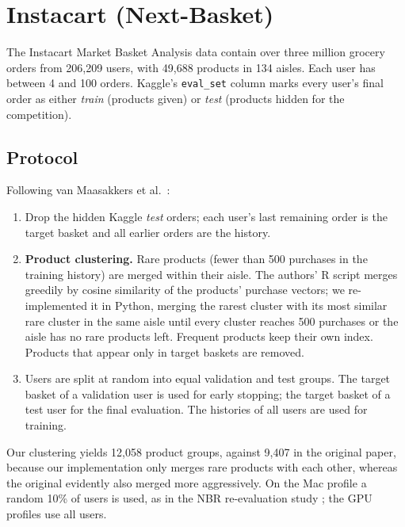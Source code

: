 \documentclass[12pt,a4paper]{report}
\begin{document}
\section{Instacart (Next-Basket)}

The Instacart Market Basket Analysis data contain over three million grocery
orders from 206,209 users, with 49,688 products in 134 aisles. Each user has
between 4 and 100 orders. Kaggle's \texttt{eval\_set} column marks every user's
final order as either \emph{train} (products given) or \emph{test} (products
hidden for the competition).

\subsection{Protocol}

Following van Maasakkers et al.\ \cite{vanmaasakkers2023}:

\begin{enumerate}
    \item Drop the hidden Kaggle \emph{test} orders; each user's last remaining
          order is the target basket and all earlier orders are the history.
    \item \textbf{Product clustering.} Rare products (fewer than 500 purchases in
          the training history) are merged within their aisle. The authors'
          R script merges greedily by cosine similarity of the products' purchase
          vectors; we re-implemented it in Python, merging the rarest cluster with
          its most similar rare cluster in the same aisle until every cluster
          reaches 500 purchases or the aisle has no rare products left. Frequent
          products keep their own index. Products that appear only in target
          baskets are removed.
    \item Users are split at random into equal validation and test groups. The
          target basket of a validation user is used for early stopping; the
          target basket of a test user for the final evaluation. The histories of
          all users are used for training.
\end{enumerate}

Our clustering yields 12,058 product groups, against 9,407 in the original
paper, because our implementation only merges rare products with each other,
whereas the original evidently also merged more aggressively. On the Mac profile a random 10\% of users is used, as in the
NBR re-evaluation study \cite{li2023}; the GPU profiles use all users.
\end{document}
